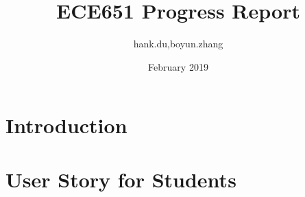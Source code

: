 \documentclass{article}
\title{ECE651 Progress Report}
\author{hank.du,boyun.zhang }
\date{February 2019}
\begin{document}
\maketitle

\section{Introduction}

\section{User Story for Students}
\end{document}
